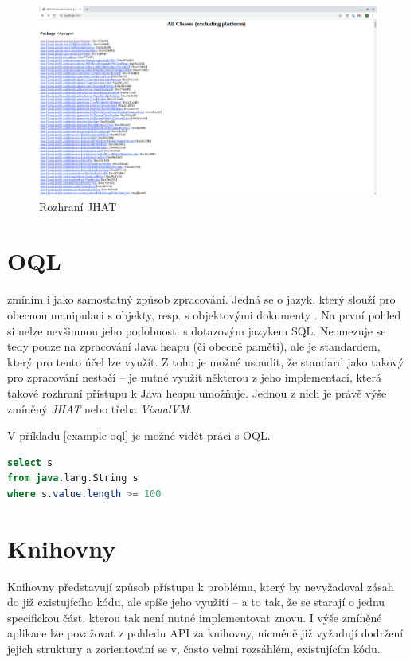 \begin{figure}[ht!]
	\centering
	\includegraphics[scale=0.3]{obrazky/jhat.png}
	\caption{Rozhraní JHAT}
	\label{obr-jhat}
\end{figure}

\section{OQL}
 zmíním i jako samostatný způsob zpracování. Jedná se o jazyk, který slouží pro obecnou manipulaci s objekty, resp. s objektovými dokumenty \cite{odmgoql}\cite{oql}. Na první pohled si nelze nevšimnou jeho podobnosti s dotazovým jazykem SQL. Neomezuje se tedy pouze na zpracování Java heapu (či obecně paměti), ale je standardem, který pro tento účel lze využít. Z toho je možné usoudit, že standard jako takový pro zpracování nestačí -- je nutné využít některou z jeho implementací, která takové rozhraní přístupu k Java heapu umožňuje. Jednou z nich je právě výše zmíněný \textit{JHAT} nebo třeba \textit{VisualVM}.

V příkladu \ref{example-oql} je možné vidět práci s OQL.

\begin{lstlisting}[caption={Příklad OQL}, label={example-oql}, frame={single}, language={SQL}, float,floatplacement=H]
select s 
from java.lang.String s 
where s.value.length >= 100
\end{lstlisting}

\section{Knihovny}
Knihovny představují způsob přístupu k problému, který by nevyžadoval zásah do již existujícího kódu, ale spíše jeho využití -- a to tak, že se starají o jednu specifickou část, kterou tak není nutné implementovat znovu. I výše zmíněné aplikace lze považovat z pohledu API za knihovny, nicméně již vyžadují dodržení jejich struktury a zorientování se v, často velmi rozsáhlém, existujícím kódu.


